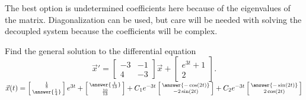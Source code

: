 \documentclass{ximera}
\begin{document}
\begin{exercise}
    \begin{hint}
        The best option is undetermined coefficients here because of the eigenvalues of the matrix. Diagonalization can be used, but care will be needed with solving the decoupled system because the coefficients will be complex. 
    \end{hint}
    Find the general solution to the differential equation
    \begin{equation*}
        {\vec{x}}' = \begin{bmatrix} -3 & -1 \\ 4 & -3 \end{bmatrix} \vec{x} + \begin{bmatrix} e^{3t} + 1 \\ 2 \end{bmatrix}. 
    \end{equation*}
    $\vec{x}(t) = \left[\begin{smallmatrix} \frac{1}{8} \\ \answer{\frac{1}{4}} \end{smallmatrix}\right]e^{3t} + \left[\begin{smallmatrix} \answer{\frac{1}{13}} \\ \frac{10}{13} \end{smallmatrix}\right] + C_1e^{-3t}\left[\begin{smallmatrix} \answer{-\cos(2t)} \\ -2\sin(2t) \end{smallmatrix}\right] + C_2e^{-3t}\left[\begin{smallmatrix} \answer{-\sin(2t)} \\ 2\cos(2t) \end{smallmatrix}\right]$
\end{exercise}
\end{document}
